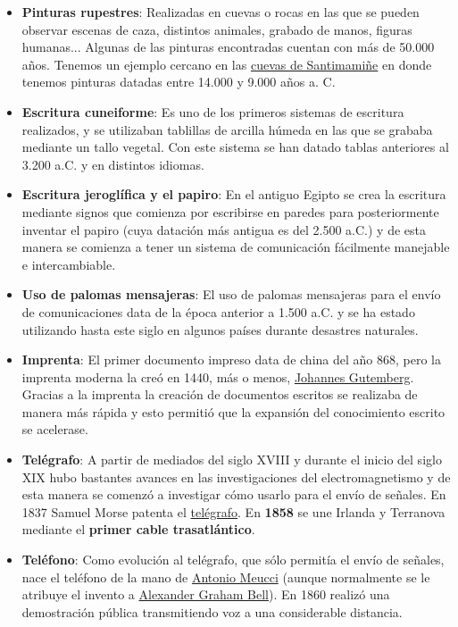 \begin{itemize}
    \item \textbf{Pinturas rupestres}: Realizadas en cuevas o rocas en las que se pueden observar escenas de caza, distintos animales, grabado de manos, figuras humanas... Algunas de las pinturas encontradas cuentan con más de 50.000 años. Tenemos un ejemplo cercano en las \href{https://es.wikipedia.org/wiki/Cueva_de_Santimami\%C3\%B1e}{cuevas de Santimamiñe} en donde tenemos pinturas datadas entre 14.000 y 9.000 años a. C.

    \item \textbf{Escritura cuneiforme}: Es uno de los primeros sistemas de escritura realizados, y se utilizaban tablillas de arcilla húmeda en las que se grababa mediante un tallo vegetal. Con este sistema se han datado tablas anteriores al 3.200 a.C. y en distintos idiomas.

    \item \textbf{Escritura jeroglífica y el papiro}: En el antiguo Egipto se crea la escritura mediante signos que comienza por escribirse en paredes para posteriormente inventar el papiro (cuya datación más antigua es del 2.500 a.C.) y de esta manera se comienza a tener un sistema de comunicación fácilmente manejable e intercambiable.

    \item \textbf{Uso de palomas mensajeras}: El uso de palomas mensajeras para el envío de comunicaciones data de la época anterior a 1.500 a.C. y se ha estado utilizando hasta este siglo en algunos países durante desastres naturales.

    \item \textbf{Imprenta}: El primer documento impreso data de china del año 868, pero la imprenta moderna la creó en 1440, más o menos, \href{https://es.wikipedia.org/wiki/Johannes_Gutenberg}{Johannes Gutemberg}. Gracias a la imprenta la creación de documentos escritos se realizaba de manera más rápida y esto permitió que la expansión del conocimiento escrito se acelerase.

    \item \textbf{Telégrafo}: A partir de mediados del siglo XVIII y durante el inicio del siglo XIX hubo bastantes avances en las investigaciones del electromagnetismo y de esta manera se comenzó a investigar cómo usarlo para el envío de señales. En 1837 Samuel Morse patenta el \href{https://es.wikipedia.org/wiki/Tel%C3%A9grafo#Historia_del_tel%C3%A9grafo}{telégrafo}. En \textbf{1858} se une Irlanda y Terranova mediante el \textbf{primer cable trasatlántico}.

    \item \textbf{Teléfono}: Como evolución al telégrafo, que sólo permitía el envío de señales, nace el teléfono de la mano de \href{https://es.wikipedia.org/wiki/Antonio_Meucci}{Antonio Meucci} (aunque normalmente se le atribuye el invento a \href{https://es.wikipedia.org/wiki/Alexander_Graham_Bell}{Alexander Graham Bell}). En 1860 realizó una demostración pública transmitiendo voz a una considerable distancia.
\end{itemize}

